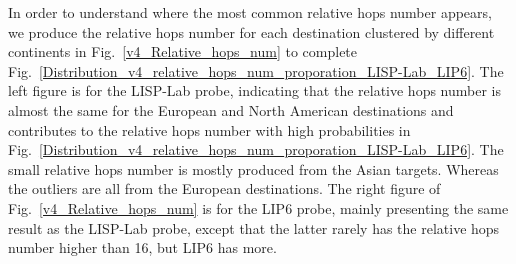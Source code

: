 In order to understand where the most common relative hops number appears, we produce the relative hops number for each destination clustered by different continents in Fig.~\ref{v4_Relative_hops_num} to complete Fig.~\ref{Distribution_v4_relative_hops_num_proporation_LISP-Lab_LIP6}. The left figure is for the LISP-Lab probe, indicating that the relative hops number is almost the same for the European and North American destinations and contributes to the relative hops number with high probabilities in Fig.~\ref{Distribution_v4_relative_hops_num_proporation_LISP-Lab_LIP6}. The small relative hops number is mostly produced from the Asian targets. Whereas the outliers are all from the European destinations. The right figure of Fig.~\ref{v4_Relative_hops_num} is for the LIP6 probe, mainly presenting the same result as the LISP-Lab probe, except that the latter rarely has the relative hops number higher than 16, but LIP6 has more.

